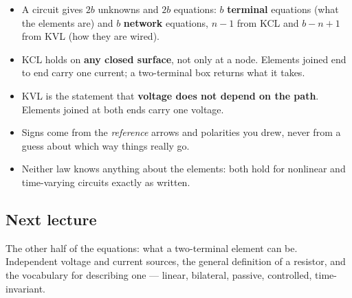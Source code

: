 \documentclass[11pt,a4paper]{article}
\begin{document}
\begin{itemize}
  \item A circuit gives $2b$ unknowns and $2b$ equations: $b$ \textbf{terminal} equations
        (what the elements are) and $b$ \textbf{network} equations,
        $n-1$ from KCL and $b-n+1$ from KVL (how they are wired).
  \item KCL holds on \textbf{any closed surface}, not only at a node. Elements joined end
        to end carry one current; a two-terminal box returns what it takes.
  \item KVL is the statement that \textbf{voltage does not depend on the path}. Elements
        joined at both ends carry one voltage.
  \item Signs come from the \emph{reference} arrows and polarities you drew, never from a
        guess about which way things really go.
  \item Neither law knows anything about the elements: both hold for nonlinear and
        time-varying circuits exactly as written.
\end{itemize}

\subsection*{Next lecture}
The other half of the equations: what a two-terminal element can be. Independent voltage
and current sources, the general definition of a resistor, and the vocabulary for
describing one --- linear, bilateral, passive, controlled, time-invariant.
\end{document}
